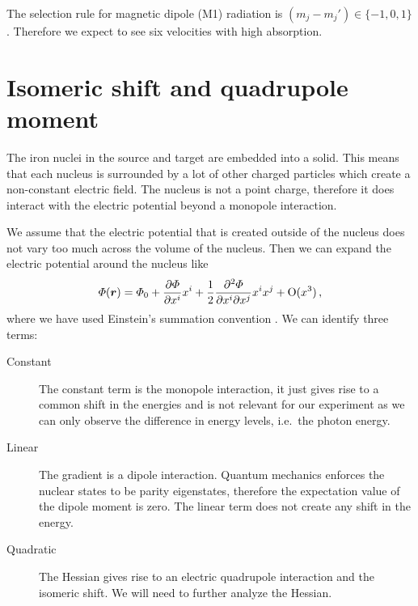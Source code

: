 \documentclass[11pt, english, fleqn, DIV=15, headinclude, BCOR=2cm]{scrreprt}
\begin{document}
The selection rule for magnetic dipole (M1) radiation is $(m_j - m_j') \in \{
-1, 0, 1 \}$. Therefore we expect to see six velocities with high absorption.

\section{Isomeric shift and quadrupole moment}

The iron nuclei in the source and target are embedded into a solid. This means
that each nucleus is surrounded by a lot of other charged particles which
create a non-constant electric field. The nucleus is not a point charge,
therefore it does interact with the electric potential beyond a monopole
interaction.

We assume that the electric potential that is created outside of the nucleus
does not vary too much across the volume of the nucleus. Then we can expand the
electric potential around the nucleus like
\[
    \Phi(\vec r) = \Phi_0 + \pd{\Phi}{x^i} x^i
    + \frac12 \frac{\partial^2 \Phi}{\partial x^i \partial x^j} x^i x^j +
    \mathrm O(x^3) \,,
\]
where we have used Einstein's summation convention
\parencite[(3.19)]{Schatz/Nukleare_Festkoerperphysik}. We can identify three
terms:

\begin{description}
    \item[Constant]
        The constant term is the monopole interaction, it just gives rise to a
        common shift in the energies and is not relevant for our experiment as
        we can only observe the difference in energy levels, i.e.\ the photon
        energy.

    \item[Linear]
        The gradient is a dipole interaction. Quantum mechanics enforces the
        nuclear states to be parity eigenstates, therefore the expectation
        value of the dipole moment is zero. The linear term does not create any
        shift in the energy.

    \item[Quadratic]
        The Hessian gives rise to an electric quadrupole interaction and the
        isomeric shift. We will need to further analyze the Hessian.
\end{description}
\end{document}

